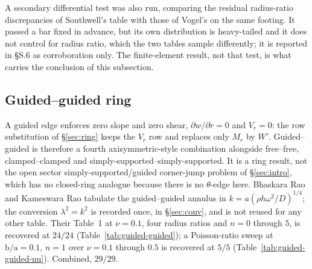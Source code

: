 \documentclass[11pt]{article}
\newcommand{\lamsq}{\lambda^{2}}
\newcommand{\ba}{\mbox{b/a}}
\begin{document}
A secondary differential test was also run, comparing the residual radius-ratio
discrepancies of Southwell's table with those of Vogel's on the same footing.
It passed a bar fixed in advance, but its own distribution is heavy-tailed and
it does not control for radius ratio, which the two tables sample differently;
it is reported in \S{}S.6 as corroboration only. The finite-element result,
not that test, is what carries the conclusion of this subsection.

\subsection{Guided--guided ring}\label{sec:guided}
A guided edge enforces zero slope and zero shear, $\partial w/\partial r=0$
and $V_r=0$: the row substitution of \S\ref{sec:ring} keeps the $V_r$ row and
replaces only $M_r$ by $W'$. Guided--guided is therefore a fourth
axisymmetric-style combination alongside free--free, clamped--clamped and
simply-supported--simply-supported. It is a ring result, not the open sector
simply-supported/guided corner-jump problem of \S\ref{sec:intro}, which has
no closed-ring analogue because there is no $\theta$-edge here. Bhaskara Rao
and Kameswara Rao \cite{bhaskararao2016} tabulate the guided--guided annulus
in $k=a(\rho h\omega^{2}/D)^{1/4}$; the conversion $\lamsq=k^{2}$ is recorded
once, in \S\ref{sec:conv}, and is not reused for any other table. Their
Table~1 at $\nu=0.1$, four radius ratios and $n=0$
through $5$, is recovered at $24/24$ (Table~\ref{tab:guided-guided}); a
Poisson-ratio sweep at $\ba=0.1$, $n=1$ over $\nu=0.1$ through $0.5$ is
recovered at $5/5$ (Table~\ref{tab:guided-guided-nu}). Combined, $29/29$.
\end{document}

